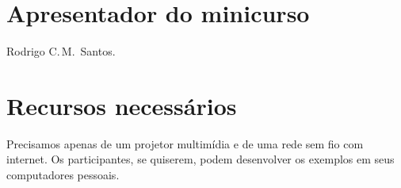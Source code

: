 \documentclass{SBCbookchapter}
\begin{document}

\section{Apresentador do minicurso}

Rodrigo C.\,M.~Santos.


\section{Recursos necessários}

Precisamos apenas de um projetor multimídia e de uma rede sem fio com
internet.  Os participantes, se quiserem, podem desenvolver os exemplos em
seus computadores pessoais.




\end{document}
